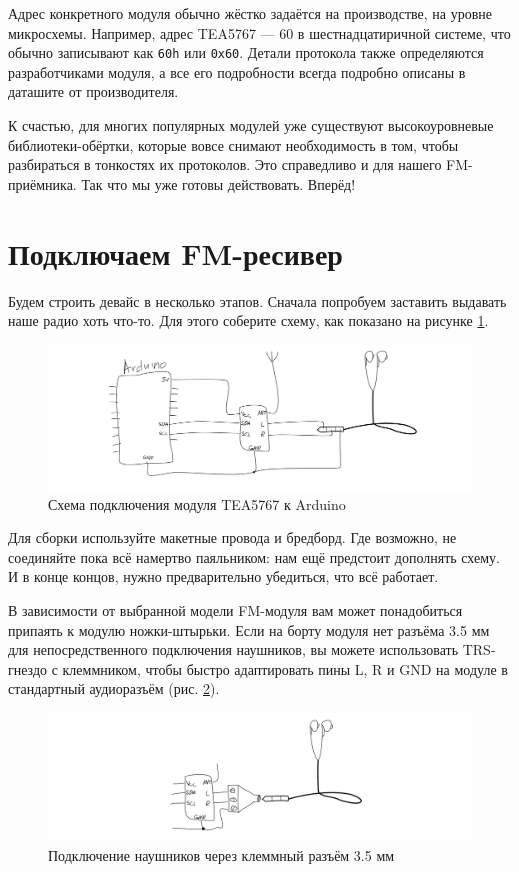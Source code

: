 Адрес конкретного модуля обычно жёстко задаётся на производстве, на уровне микросхемы. Например, адрес TEA5767 — 60 в шестнадцатиричной системе, что обычно записывают как \texttt{60h} или \texttt{0x60}.  Детали протокола также определяются разработчиками модуля, а все его подробности всегда подробно описаны в даташите от производителя.

К счастью, для многих популярных модулей уже существуют высокоуровневые библиотеки-обёртки, которые вовсе снимают необходимость в том, чтобы разбираться в тонкостях их протоколов. Это справедливо и для нашего FM-приёмника. Так что мы уже готовы действовать. Вперёд!

\section{Подключаем FM-ресивер}

Будем строить девайс в несколько этапов. Сначала попробуем заставить выдавать наше радио хоть что-то. Для этого соберите схему, как показано на рисунке \ref{fig:tea5767-wiring}.


\begin{figure}
  \centering
  \includegraphics{sketches/tea5767-wiring}
  \caption{Схема подключения модуля TEA5767 к Arduino}
  \label{fig:tea5767-wiring}
\end{figure}

Для сборки используйте макетные провода и бредборд. Где возможно, не соединяйте пока всё намертво паяльником: нам ещё предстоит дополнять схему. И в конце концов, нужно предварительно убедиться, что всё работает.

В зависимости от выбранной модели FM-модуля вам может понадобиться припаять к модулю ножки-штырьки. Если на борту модуля нет разъёма 3.5 мм для непосредственного подключения наушников, вы можете использовать TRS-гнездо с клеммником, чтобы быстро адаптировать пины L, R и GND на модуле в стандартный аудиоразъём (рис. \ref{fig:trs-35-mm}).

\begin{figure}
  \centering
  \includegraphics{sketches/trs-35-mm}
  \caption{Подключение наушников через клеммный разъём 3.5 мм}
  \label{fig:trs-35-mm}
\end{figure}

